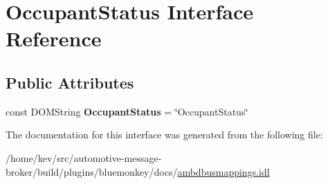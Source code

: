 \hypertarget{interfaceOccupantStatus}{\section{Occupant\+Status Interface Reference}
\label{interfaceOccupantStatus}
}
\subsection*{Public Attributes}
\begin{DoxyCompactItemize}
\item 
\hypertarget{interfaceOccupantStatus_acfe99b178c11dc9cdc91511914914200}{const D\+O\+M\+String {\bfseries Occupant\+Status} = \char`\"{}Occupant\+Status\char`\"{}}\label{interfaceOccupantStatus_acfe99b178c11dc9cdc91511914914200}

\end{DoxyCompactItemize}


The documentation for this interface was generated from the following file\+:\begin{DoxyCompactItemize}
\item 
/home/kev/src/automotive-\/message-\/broker/build/plugins/bluemonkey/docs/\hyperlink{ambdbusmappings_8idl}{ambdbusmappings.\+idl}\end{DoxyCompactItemize}
